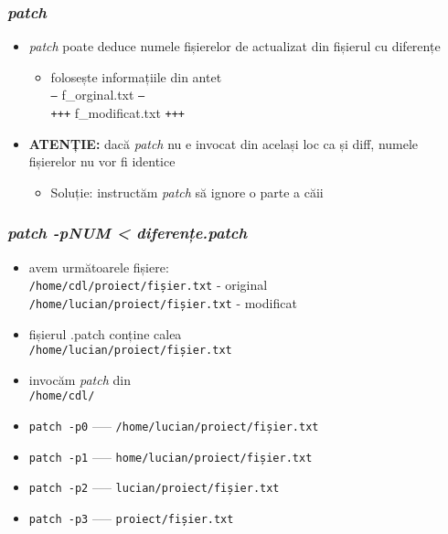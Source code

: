 \documentclass{beamer}
\begin{document}
\begin{frame}
  \frametitle{\textit{patch}}
  \begin{itemize}[<+->]

  \item \textit{patch} poate deduce numele fișierelor de actualizat din fișierul cu diferențe
    \begin{itemize}
    \item folosește informațiile din antet \\
      \texttt{---} f\_orginal.txt \texttt{---} \\
      \texttt{+++} f\_modificat.txt \texttt{+++}
    \end{itemize}

  \item \textbf{ATENȚIE: } dacă \textit{patch} nu e invocat din același loc ca și diff, numele fișierelor nu vor fi identice
    \begin{itemize}
    \item Soluție: instructăm \textit{patch} să ignore o parte a căii
    \end{itemize}
  \end{itemize}
\end{frame}

\begin{frame}
  \frametitle{\textit{patch -pNUM < diferențe.patch}}
  \begin{itemize}[<+->]
  \item avem următoarele fișiere:                        \\
    \texttt{/home/cdl/proiect/fișier.txt} - original     \\
    \texttt{/home/lucian/proiect/fișier.txt} - modificat \\
  \item fișierul .patch conține calea \\
    \texttt{/home/lucian/proiect/fișier.txt}
  \item invocăm \textit{patch} din \\
    \texttt{/home/cdl/}
  \item \texttt{patch -p0} ––– \texttt{/home/lucian/proiect/fișier.txt}
  \item \texttt{patch -p1} ––– \texttt{home/lucian/proiect/fișier.txt}
  \item \texttt{patch -p2} ––– \texttt{lucian/proiect/fișier.txt}
  \item \texttt{patch -p3} ––– \texttt{proiect/fișier.txt}
  \end{itemize}
\end{frame}
\end{document}
